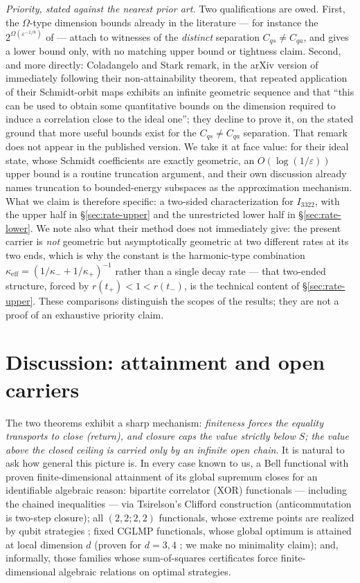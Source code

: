 \documentclass[11pt]{article}
\theoremstyle{remark}
\newcommand{\Cqs}{C_{qs}}
\newcommand{\keff}{\kappa_{\mathrm{eff}}}
\newcommand{\eps}{\varepsilon}
\begin{document}
\emph{Priority, stated against the nearest prior art.} Two
qualifications are owed. First, the $\Omega$-type dimension bounds already in the
literature --- for instance the $2^{\Omega(\eps^{-1/8})}$ of
\cite{Coladangelo} --- attach to witnesses of the \emph{distinct}
separation $\Cqs\neq C_{qa}$, and \cite{Coladangelo} gives a lower bound
only, with no matching upper bound or tightness claim. Second, and more
directly: Coladangelo and Stark remark, in the arXiv version of
\cite{ColadangeloStark} immediately following their non-attainability
theorem, that repeated application of their Schmidt-orbit maps exhibits
an infinite geometric sequence and that ``this can be used to obtain some
quantitative bounds on the dimension required to induce a correlation
close to the ideal one''; they decline to prove it, on the stated ground
that more useful bounds exist for the $\Cqs\neq C_{qa}$ separation. That
remark does not appear in the published version. We take it at face
value: for their ideal state, whose Schmidt coefficients are exactly
geometric, an $O(\log(1/\eps))$ upper bound is a routine truncation
argument, and their own discussion already names truncation to
bounded-energy subspaces as the approximation mechanism. What we claim is
therefore specific: a two-sided characterization for $I_{3322}$,
with the upper half in \S\ref{sec:rate-upper} and the unrestricted
lower half in \S\ref{sec:rate-lower}. We note also what their
method does not immediately give: the present carrier is \emph{not}
geometric but asymptotically geometric at two different rates at its two
ends, which is why the constant is the harmonic-type combination
$\keff=(1/\kappa_-+1/\kappa_+)^{-1}$ rather than a single decay rate ---
that two-ended structure, forced by $r(t_+)<1<r(t_-)$, is the technical
content of \S\ref{sec:rate-upper}. These comparisons distinguish the scopes of the results; they are not
a proof of an exhaustive priority claim.

\section{Discussion: attainment and open carriers}\label{sec:discussion}

The two theorems exhibit a sharp mechanism: \emph{finiteness forces the
equality transports to close (return), and closure caps the value strictly
below $S$; the value above the closed ceiling is carried only by an infinite
open chain}. It is natural to ask how general this picture is. In every
case known to us, a Bell functional with proven finite-dimensional
attainment of its global supremum closes for an identifiable algebraic
reason: bipartite correlator (XOR) functionals --- including the chained
inequalities --- via Tsirelson's Clifford construction \cite{Tsirelson,CHTW}
(anticommutation is two-step closure); all $(2,2;2,2)$ functionals, whose
extreme points are realized by qubit strategies \cite{Masanes}; fixed CGLMP
functionals, whose global optimum is attained at local dimension $d$ (proven
for $d=3,4$ \cite{IoannouRosset}; we make no minimality claim); and,
informally, those families whose sum-of-squares certificates force
finite-dimensional algebraic relations on optimal strategies.
\end{document}

